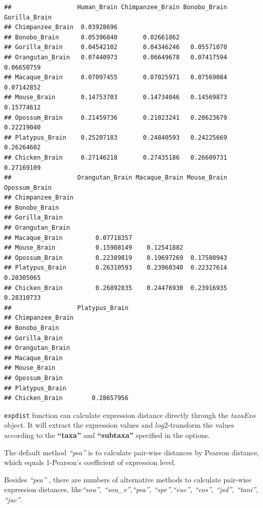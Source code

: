 \documentclass[]{book}
\begin{document}
\begin{verbatim}
##                  Human_Brain Chimpanzee_Brain Bonobo_Brain Gorilla_Brain
## Chimpanzee_Brain  0.03928696                                            
## Bonobo_Brain      0.05396840       0.02661862                           
## Gorilla_Brain     0.04542102       0.04346246   0.05571070              
## Orangutan_Brain   0.07440973       0.06649678   0.07417594    0.06650759
## Macaque_Brain     0.07097455       0.07025971   0.07569084    0.07142852
## Mouse_Brain       0.14753703       0.14734046   0.14569873    0.15774612
## Opossum_Brain     0.21459736       0.21023241   0.20623679    0.22219040
## Platypus_Brain    0.25207183       0.24840593   0.24225669    0.26264602
## Chicken_Brain     0.27146218       0.27435186   0.26609731    0.27169109
##                  Orangutan_Brain Macaque_Brain Mouse_Brain Opossum_Brain
## Chimpanzee_Brain                                                        
## Bonobo_Brain                                                            
## Gorilla_Brain                                                           
## Orangutan_Brain                                                         
## Macaque_Brain         0.07718357                                        
## Mouse_Brain           0.15908149    0.12541882                          
## Opossum_Brain         0.22389819    0.19697269  0.17580943              
## Platypus_Brain        0.26310593    0.23960340  0.22327614    0.20305065
## Chicken_Brain         0.26892835    0.24476930  0.23916935    0.28310733
##                  Platypus_Brain
## Chimpanzee_Brain               
## Bonobo_Brain                   
## Gorilla_Brain                  
## Orangutan_Brain                
## Macaque_Brain                  
## Mouse_Brain                    
## Opossum_Brain                  
## Platypus_Brain                 
## Chicken_Brain        0.28657956
\end{verbatim}

\texttt{expdist} function can calculate expression distance directly through the \emph{taxaExo} object. It will extract the expression values and \(log2\)-transform the values according to the \textbf{``taxa''} and \textbf{``subtaxa''} specified in the options.

The default method \emph{``pea''} is to calculate pair-wise distances by Pearson distance, which equals 1-Pearson's coefficient of expression level.

Besides \emph{``pea''} , there are numbers of alternative methods to calculate pair-wise expression distances, like\emph{``sou'', ``sou\_v'',``pea'', ``spe'',``euc'', ``cos'', ``jsd'', ``tani'', ``jac''}.
\end{document}
